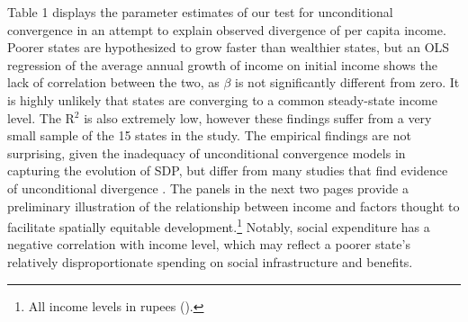\documentclass[a4paper, 11pt]{article}
\begin{document}
Table 1 displays the parameter estimates of our test for unconditional convergence in an attempt to explain observed divergence of per capita income.  Poorer states are hypothesized to grow faster than wealthier states, but an OLS regression of the average annual growth of income on initial income shows the lack of correlation between the two, as $\beta$ is not significantly different from zero.  It is highly unlikely that states are converging to a common steady-state income level.  The R$^{2}$ is also extremely low, however these findings suffer from a very small sample of the 15 states in the study.  The empirical findings are not surprising, given the inadequacy of unconditional convergence models in capturing the evolution of SDP, but differ from many studies that find evidence of unconditional divergence \citep{ghosh_economic_2008,nagaraj_long-run_2000,aiyar_growth_2001,ghosh_regional_2012}.  
The panels in the next two pages provide a preliminary illustration of the relationship between income and factors thought to facilitate spatially equitable development.\footnote{All income levels in rupees (\rupee).}  Notably, social expenditure has a negative correlation with income level, which may reflect a poorer state's relatively disproportionate spending on social infrastructure and benefits.\par
\end{document}
